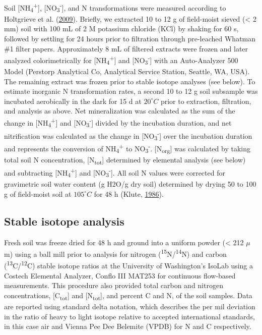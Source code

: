 \documentclass [11pt, proquest] {uwthesis}[2015/03/03]
\begin{document}
Soil {[}NH\textsubscript{4}\textsuperscript{+}{]},
{[}NO\textsubscript{3}\textsuperscript{-}{]}, and N transformations were
measured according to Holtgrieve et al.
(\protect\hyperlink{ref-Holtgrieve2009}{2009}). Briefly, we extracted 10
to 12 g of field-moist sieved (\textless{} 2 mm) soil with 100 mL of 2 M
potassium chloride (KCl) by shaking for 60 s, followed by settling for
24 hours prior to filtration through pre-leached Whatman \#1 filter
papers. Approximately 8 mL of filtered extracts were frozen and later
analyzed colorimetrically for
{[}NH\textsubscript{4}\textsuperscript{+}{]} and
{[}NO\textsubscript{3}\textsuperscript{-}{]} with an Auto-Analyzer 500
Model (Perstorp Analytical Co, Analytical Service Station, Seattle, WA,
USA). The remaining extract was frozen prior to stable isotope analyses
(see below). To estimate inorganic N transformation rates, a second 10
to 12 g soil subsample was incubated aerobically in the dark for 15 d at
\(20^{\circ}C\) prior to extraction, filtration, and analysis as above.
Net mineralization was calculated as the sum of the change in
{[}NH\textsubscript{4}\textsuperscript{+}{]} and
{[}NO\textsubscript{3}\textsuperscript{-}{]} divided by the incubation
duration, and net nitrification was calculated as the change in
{[}NO\textsubscript{3}\textsuperscript{-}{]} over the incubation
duration and represents the conversion of
NH\textsubscript{4}\textsuperscript{+} to
NO\textsubscript{3}\textsuperscript{-}. {[}N\textsubscript{org}{]} was
calculated by taking total soil N concentration,
{[}N\textsubscript{tot}{]} determined by elemental analysis (see below)
and subtracting {[}NH\textsubscript{4}\textsuperscript{+}{]} and
{[}NO\textsubscript{3}\textsuperscript{-}{]}. All soil N values were
corrected for gravimetric soil water content (g H2O/g dry soil)
determined by drying 50 to 100 g of field-moist soil at \(105^{\circ}C\)
for 48 h (Klute, \protect\hyperlink{ref-Klute1986}{1986}).

\subsection{Stable isotope analysis}\label{stable-isotope-analysis}

Fresh soil was freeze dried for 48 h and ground into a uniform powder
(\textless{} 212 \(\mu\)m) using a ball mill prior to analysis for
nitrogen (\textsuperscript{15}N/\textsuperscript{14}N) and carbon
(\textsuperscript{13}C/\textsuperscript{12}C) stable isotope ratios at
the University of Washington's IsoLab using a Costech Elemental
Analyzer, Conflo III MAT253 for continuous flow-based measurements. This
procedure also provided total carbon and nitrogen concentrations,
{[}C\textsubscript{tot}{]} and {[}N\textsubscript{tot}{]}, and percent C
and N, of the soil samples. Data are reported using standard delta
notation, which describes the per mil deviation in the ratio of heavy to
light isotope relative to accepted international standards, in this case
air and Vienna Pee Dee Belemite (VPDB) for N and C respectively.
\end{document}
